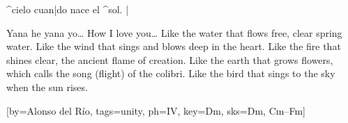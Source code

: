     ^cielo cuan|do nace el ^sol. | \e
  \endverse
  \begin{translation}
    Yana he yana yo\ldots
    \nextverse
    How I love you\ldots
    \nextverse
    Like the water that flows free,
    clear spring water.
    Like the wind that sings and blows
    deep in the heart.
    \nextverse
    Like the fire that shines clear,
    the ancient flame of creation.
    Like the earth that grows flowers,
    which calls the song (flight) of the colibri.
    \nextverse
    Like the bird that sings
    to the sky when the sun rises.
  \end{translation}
\endsong


[by={Alonso del Río}, tags={unity}, ph={IV}, key={Dm}, sks={Dm, Cm--F\shrp{}m}]
  \beginchorus
\]\]\]\]\]\]\]\]\]\]\]\]\]\]\]\]\]\]\]\]\]\]\]\]\]\]\]\]\]\]\]\]\]\]\]\]\]\]\]\]\]\]\]\]\]\]\]\]\]\]\]\]\]\]\]\]\]\]\]\]\]\]\]\]\]\]\]\]\]\]\]\]\]\]\]\]\]\]\]\]\]\]\]\]\]\]\]\]\]\]\]\]\]\]\]\]\]\]\]\]\]\]\]\]\]\]\]\]\]\]\]\]\]\]\]\]\]\]\]\]\]\]\]\]\]\]\]\]\]\]\]\]\]\]\]\]\]\]\]\]\]\]\]\]\]\]\]\]\]\]\]\]\]\]\]\]\]\]\]\]\]\]\]\]\]\]\]\]\]\]\]\]\]\]\]\]\]\]\]\]\]\]\]\]\]\]\]\]\]\]\]\]\]\]\]\]\]\]\]\]\]\]\]\]\]\]\]\]\]\]\]\]\]\]\]\]\]\]\]\]\]\]\]\]\]\]\]\]\]\]\]\]\]\]\]\]\]\]\]\]\]\]\]\]\]\]\]\]\]\]\]\]\]\]\]\]\]\]\]\]\]\]\]\]\]\]\]\]\]\]\]\]\]\]\]\]\]\]\]\]\]\]\]\]\]\]\]\]\]\]\]\]\]\]\]\]\]\]\]\]\]\]\]\]\]\]\]\]\]\]\]\]\]\]\]\]\]\]\]\]\]\]\]\]\]\]\]\]\]\]\]\]\]\]\]\]\]\]\]\]\]\]\]\]\]\]\]\]\]\]\]\]\]\]\]\]\]\]\]\]\]\]\]\]\]\]\]\]\]\]\]\]\]\]\]\]\]\]\]\]\]\]\]\]\]\]\]\]\]\]\]\]\]\]\]\]\]\]\]\]\]\]\]\]\]\]\]\]\]\]\]\]\]\]\]\]\]\]\]\]\]\]\]\]\]\]\]\]\]\]\]\]\]\]\]\]\]\]\]\]\]\]\]\]\]\]\]\]\]\]\]\]\]\]\]\]\]\]\]\]\]\]\]\]\]\]\]\]\]\]\]\]\]\]\]\]\]\]\]\]\]\]\]\]\]\]\]\]\]\]\]\]\]\]\]\]\]\]\]\]\]\]\]\]\]\]\]\]\]\]\]\]\]\]\]\]\]\]\]\]\]\]\]\]\]\]\]\]\]\]\]\]\]\]\]\]\]\]\]\]\]\]\]\]\]\]\]\]\]\]\]\]\]\]\]\]\]\]\]\]\]\]\]\]\]\]\]\]\]\]\]\]\]\]\]\]\]\]\]\]\]\]\]\]\]\]\]\]\]\]\]\]\]\]\]\]\]\]\]\]\]\]\]\]\]\]\]\]\]\]\]\]\]\]\]\]\]\]\]\]\]\]\]\]\]\]\]\]\]\]\]\]\]\]\]\]\]\]\]\]\]\]\]\]\]\]\]\]\]\]\]\]\]\]\]\]\]\]\]\]\]\]\]\]\]\]\]\]\]\]\]\]\]\]\]\]\]\]\]\]\]\]\]\]\]\]\]\]\]\]\]\]\]\]\]\]\]\]\]\]\]\]\]\]\]\]\]\]\]\]\]\]\]\]\]\]\]\]\]\]\]\]\]\]\]\]\]\]\]\]\]\]\]\]\]\]\]\]\]\]\]\]\]\]\]\]\]\]\]\]\]\]\]\]\]\]\]\]\]\]\]\]\]\]\]\]\]\]\]\]\]\]\]\]\]\]\]\]\]\]\]\]\]\]\]\]\]\]\]\]\]\]\]\]\]\]\]\]\]\]\]\]\]\]\]\]\]\]\]\]\]\]\]\]\]\]\]\]\]\]\]\]\]\]\]\]\]\]\]\]\]\]\]\]\]\]\]\]\]\]\]\]\]\]\]\]\]\]\]\]\]\]\]\]\]\]\]\]\]\]\]\]\]\]\]\]\]\]\]\]\]\]\]\]\]\]\]\]\]\]\]\]\]\]\]\]\]\]\]\]\]\]\]\]\]\]\]\]\]\]\]\]\]\]\]\]\]\]\]\]\]\]\]\]\]\]\]\]\]\]\]\]\]\]\]\]\]\]\]\]\]\]\]\]\]\]\]\]\]\]\]\]\]\]\]\]\]\]\]\]\]\]\]\]\]\]\]\]\]\]\]\]\]\]\]\]\]\]\]\]\]\]\]\]\]\]\]\]\]\]\]\]\]\]\]\]\]\]\]\]\]\]\]\]\]\]\]\]\]\]\]\]\]\]\]\]\]\]\]\]\]\]\]\]\]\]\]\]\]\]\]\]\]\]\]\]\]\]\]\]\]\]\]\]\]\]\]\]\]\]\]\]\]\]\]\]\]\]\]\]\]\]\]\]\]\]\]\]\]\]\]\]\]\]\]\]\]\]\]\]\]\]\]\]\]\]\]\]\]\]\]\]\]\]\]\]\]\]\]\]\]\]\]\]\]\]\]\]\]\]\]\]\]\]\]\]\]\]\]\]\]\]\]\]\]\]\]\]\]\]\]\]\]\]\]\]\]\]\]\]\]\]\]\]\]\]\]\]\]\]\]\]\]\]\]\]\]\]\]\]\]\]\]\]\]\]\]\]\]\]\]\]\]\]\]\]\]\]\]\]\]\]\]\]\]\]\]\]\]\]\]\]\]\]\]\]\]\]\]\]\]\]\]\]\]\]\]\]\]\]\]\]\]\]\]\]\]\]\]\]\]\]\]\]\]\]\]
